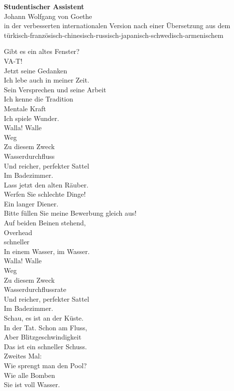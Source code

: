 {	
			
		{\large \textbf{Studentischer Assistent} \\
		Johann Wolfgang von Goethe} \\
		{\small in der verbesserten internationalen Version nach einer Übersetzung aus dem türkisch-französisch-chinesisch-russisch-japanisch-schwedisch-armenischem \\}
		
		Gibt es ein altes Fenster? \\
		VA-T! \\
		Jetzt seine Gedanken \\
		Ich lebe auch in meiner Zeit. \\
		Sein Versprechen und seine Arbeit \\
		Ich kenne die Tradition \\
		Mentale Kraft \\
		Ich spiele Wunder. \\
		
		Walla! Walle \\
		Weg \\
		Zu diesem Zweck \\
		Wasserdurchfluss \\
		Und reicher, perfekter Sattel \\
		Im Badezimmer. \\
		
		Lass jetzt den alten Räuber. \\
		Werfen Sie schlechte Dinge! \\
		Ein langer Diener. \\
		Bitte füllen Sie meine Bewerbung gleich aus! \\
		Auf beiden Beinen stehend, \\
		Overhead \\
		schneller \\
		In einem Wasser, im Wasser. \\
		
		Walla! Walle \\
		Weg \\
		Zu diesem Zweck \\
		Wasserdurchflussrate \\
		Und reicher, perfekter Sattel \\
		Im Badezimmer. \\
		
		Schau, es ist an der Küste. \\
		In der Tat. Schon am Fluss, \\
		Aber Blitzgeschwindigkeit \\
		Das ist ein schneller Schuss. \\
		Zweites Mal: \\
		Wie sprengt man den Pool? \\
		Wie alle Bomben \\
		Sie ist voll Wasser. \\
		
}
